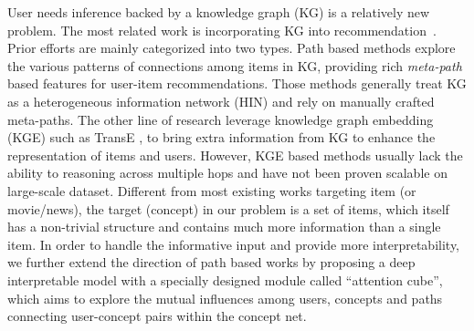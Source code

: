 User needs inference backed by a knowledge graph (KG) is a relatively new problem. 
The most related work is incorporating KG into recommendation~\cite{zhang2016collaborative,sun2018recurrent,huang2018improving}.
Prior efforts are mainly categorized into two types. 
Path based methods \cite{zhao2017meta,hu2018leveraging} explore the various patterns of connections among items in KG, providing rich \textit{meta-path} based features for
user-item recommendations.
Those methods generally treat KG as a heterogeneous information network (HIN) and rely on manually crafted meta-paths.
The other line of research \cite{wang2018dkn,huang2018improving} leverage knowledge graph embedding (KGE) such as TransE \cite{bordes2013translating}, to bring extra information from KG to enhance the representation of items and users. 
However, KGE based methods usually lack the ability to reasoning across multiple hops and have not been proven scalable on large-scale dataset.
Different from most existing works targeting item (or movie/news), 
the target (concept) in our problem is a set of items, which itself has a non-trivial structure and contains much more information than a single item.
In order to handle the informative input and provide more interpretability,
we further extend the direction of path based works
by proposing a deep interpretable model with a specially designed module 
called ``attention cube'', which
aims to explore the mutual influences among users, concepts and paths 
connecting user-concept pairs within the concept net.


